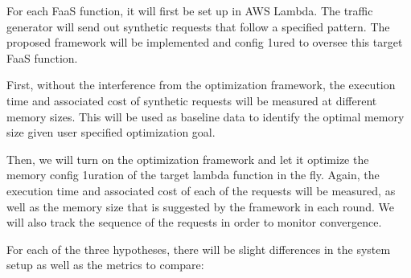 \documentclass[conference]{IEEEtran}
\begin{document}
For each FaaS function, it will first be set up in AWS Lambda. The traffic generator will send out synthetic requests that follow a specified pattern. The proposed framework will be implemented and config 1ured to oversee this target FaaS function. 

First, without the interference from the optimization framework, the execution time and associated cost of synthetic requests will be measured at different memory sizes. This will be used as baseline data to identify the optimal memory size given user specified optimization goal.

Then, we will turn on the optimization framework and let it optimize the memory config 1uration of the target lambda function in the fly. Again, the execution time and associated cost of each of the requests will be measured, as well as the memory size that is suggested by the framework in each round. We will also track the sequence of the requests in order to monitor convergence.

For each of the three hypotheses, there will be slight differences in the system setup as well as the metrics to compare:
\end{document}
